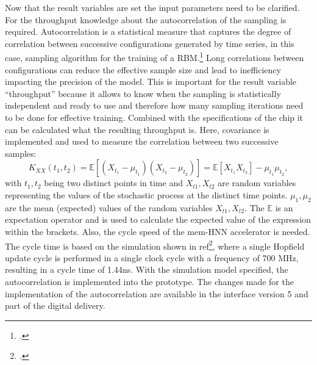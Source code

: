 Now that the result variables are set the input parameters need to be clarified. 
For the throughput knowledge about the autocorrelation of the sampling is required.
Autocorrelation is a statistical measure that captures the degree of correlation between successive configurations generated by time series, in this case, sampling algorithm for the training of a \ac{RBM}.\footcite[cf.][1-6]{tanakaReductionAutocorrelationHMC2017}
Long correlations between configurations can reduce the effective sample size and lead to inefficiency impacting the precision of the model.
This is important for the result variable ``throughput'' because it allows to know when the sampling is statistically independent and ready to use and therefore how many sampling iterations need to be done for effective training. 
Combined with the specifications of the chip it can be calculated what the resulting throughput is.
Here, covariance is implemented and used to measure the correlation between two successive samples:
\begin{equation}
    K_{XX}(t_1, t_2) = \mathbb{E}[(X_{t_1} - \mu_{t_1})(X_{t_2} - \mu_{t_2})] = \mathbb{E}[X_{t_1} X_{t_2}] - \mu_{t_1}\mu_{t_2},
\end{equation}
with \(t_1,t_2\) being two distinct points in time and \(X_{t1},X_{t2}\) are random variables representing the values of the stochastic process at the distinct time points. 
\(\mu_1,\mu_2\) are the mean (expected) values of the random variables \(X_{t1},X_{t2}\). 
The \(\mathbb{E}\) is an expectation operator and is used to calculate the expected value of the expression within the brackets.
Also, the cycle speed of the \ac{mem-HNN} accelerator is needed. 
The cycle time is based on the simulation shown in ref\footcite[cf.][4]{hizzaniMemristorbasedHardwareAlgorithms2023}, where a single Hopfield update cycle is performed in a single clock cycle with a frequency of 700 MHz, resulting in a cycle time of 1.44ns.
With the simulation model specified, the autocorrelation is implemented into the prototype. 
The changes made for the implementation of the autocorrelation are available in the interface version 5 and part of the digital delivery. 

